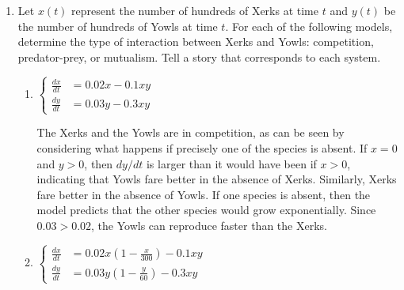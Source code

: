 \documentclass[main]{subfiles}
\begin{document}
\begin{enumerate}
\begin{enumerate}
  \end{enumerate}

\pspace{\newpage}
\item  


    Let $x(t)$ represent the number of hundreds of Xerks at time $t$ and $y(t)$ be
    the number of hundreds of Yowls at time $t$.  For each of the following models, 
    determine the type of interaction between Xerks and Yowls:  competition, 
    predator-prey, or mutualism.  Tell a story that corresponds to each system.

\begin{enumerate}
   \item 
   \begin{problem}[0.1in]   
    $\left\{\begin{aligned}
      \frac{dx}{dt} & = 0.02x  - 0.1xy \\
      \frac{dy}{dt} & = 0.03y -  0.3xy
    \end{aligned}\right.$
   \end{problem}

   \begin{solution}
     The Xerks and the Yowls are in competition, as can be seen by considering
     what happens if precisely one of the species is absent.  If $x = 0$ and $y > 0$,
     then $dy/dt$ is larger than it would have been if $x > 0$, indicating that
     Yowls fare better in the absence of Xerks.  Similarly, Xerks fare better in the
     absence of Yowls.  If one species is absent, then
     the model predicts that the other species would grow exponentially.  Since
     $0.03 > 0.02$, the Yowls can reproduce faster than the Xerks.  
   \end{solution}

\item 
   \begin{problem}[0.1in]   
    $\left\{\begin{aligned}
      \frac{dx}{dt} & = 0.02x\left( 1 - \frac{x}{300} \right) - 0.1xy \\
      \frac{dy}{dt} & = 0.03y\left( 1 - \frac{y}{60}  \right) - 0.3xy
    \end{aligned}\right.$
   \end{problem}


\end{enumerate}
\end{enumerate}
\end{document}
